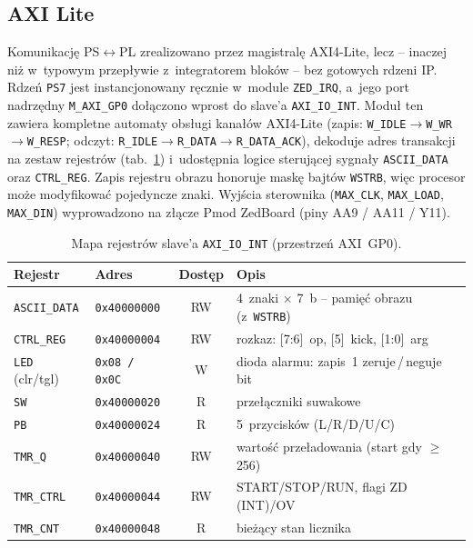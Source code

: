 \documentclass[12pt,a4paper]{article}
\begin{document}
\subsection{AXI Lite} %

Komunikację PS$\leftrightarrow$PL zrealizowano przez magistralę AXI4-Lite, lecz
-- inaczej niż w~typowym przepływie z~integratorem bloków -- bez gotowych
rdzeni IP. Rdzeń \texttt{PS7} jest instancjonowany ręcznie w~module
\texttt{ZED\_IRQ}, a~jego port nadrzędny \texttt{M\_AXI\_GP0} dołączono wprost
do slave'a \texttt{AXI\_IO\_INT}. Moduł ten zawiera kompletne
automaty obsługi kanałów AXI4-Lite (zapis:
\texttt{W\_IDLE}$\rightarrow$\texttt{W\_WR}$\rightarrow$\texttt{W\_RESP};
odczyt: \texttt{R\_IDLE}$\rightarrow$\texttt{R\_DATA}$\rightarrow$\texttt{R\_DATA\_ACK}),
dekoduje adres transakcji na zestaw rejestrów (tab.~\ref{tab:regs}) i~udostępnia
logice sterującej sygnały \texttt{ASCII\_DATA} oraz \texttt{CTRL\_REG}. Zapis
rejestru obrazu honoruje maskę bajtów \texttt{WSTRB}, więc procesor może
modyfikować pojedyncze znaki. Wyjścia sterownika (\texttt{MAX\_CLK},
\texttt{MAX\_LOAD}, \texttt{MAX\_DIN}) wyprowadzono na złącze Pmod ZedBoard
(piny AA9 / AA11 / Y11).

\begin{table}[H]
\centering
\caption{Mapa rejestrów slave'a \texttt{AXI\_IO\_INT} (przestrzeń AXI~GP0).}
\label{tab:regs}
\small
\begin{tabularx}{\textwidth}{@{}l l c X@{}}
\toprule
\textbf{Rejestr} & \textbf{Adres} & \textbf{Dostęp} & \textbf{Opis} \\
\midrule
\texttt{ASCII\_DATA} & \texttt{0x40000000} & RW & 4~znaki $\times$ 7~b -- pamięć obrazu (z~\texttt{WSTRB}) \\
\texttt{CTRL\_REG}  & \texttt{0x40000004} & RW & rozkaz: [7:6]~op, [5]~kick, [1:0]~arg \\
\texttt{LED} (clr/tgl) & \texttt{0x08\,/\,0x0C} & W & dioda alarmu: zapis~1 zeruje\,/\,neguje bit \\
\texttt{SW}         & \texttt{0x40000020} & R  & przełączniki suwakowe \\
\texttt{PB}         & \texttt{0x40000024} & R  & 5~przycisków (L/R/D/U/C) \\
\texttt{TMR\_Q}     & \texttt{0x40000040} & RW & wartość przeładowania (start gdy $\ge$256) \\
\texttt{TMR\_CTRL}  & \texttt{0x40000044} & RW & START/STOP/RUN, flagi ZD\,(INT)/OV \\
\texttt{TMR\_CNT}   & \texttt{0x40000048} & R  & bieżący stan licznika \\
\bottomrule
\end{tabularx}
\end{table}
\end{document}

